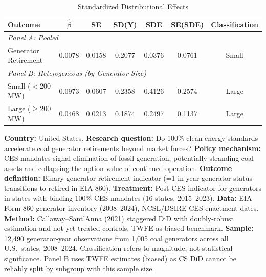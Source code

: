 \begin{table}[t]
\centering
\caption{Standardized Distributional Effects}
\label{tab:sde}
\begin{tabular}{lcccccc}
\hline\hline
Outcome & $\hat{\beta}$ & SE & SD(Y) & SDE & SE(SDE) & Classification \\
\hline
\multicolumn{7}{l}{\textit{Panel A: Pooled}} \\[3pt]
Generator Retirement & 0.0078 & 0.0158 & 0.2077 & 0.0376 & 0.0761 & Small \\
[6pt]
\multicolumn{7}{l}{\textit{Panel B: Heterogeneous (by Generator Size)}} \\[3pt]
Small ($<$200 MW) & 0.0973 & 0.0607 & 0.2358 & 0.4126 & 0.2574 & Large \\
Large ($\geq$200 MW) & 0.0468 & 0.0213 & 0.1874 & 0.2497 & 0.1137 & Large \\
\hline\hline
\end{tabular}
\begin{flushleft}\small
\textbf{Country:} United States.
\textbf{Research question:} Do 100\% clean energy standards accelerate coal generator retirements beyond market forces?
\textbf{Policy mechanism:} CES mandates signal elimination of fossil generation, potentially stranding coal assets and collapsing the option value of continued operation.
\textbf{Outcome definition:} Binary generator retirement indicator (=1 in year generator status transitions to retired in EIA-860).
\textbf{Treatment:} Post-CES indicator for generators in states with binding 100\% CES mandates (16 states, 2015--2023).
\textbf{Data:} EIA Form 860 generator inventory (2008--2024), NCSL/DSIRE CES enactment dates.
\textbf{Method:} Callaway--Sant'Anna (2021) staggered DiD with doubly-robust estimation and not-yet-treated controls. TWFE as biased benchmark.
\textbf{Sample:} 12,490 generator-year observations from 1,005 coal generators across all U.S.\ states, 2008--2024.
Classification refers to magnitude, not statistical significance. Panel B uses TWFE estimates (biased) as CS DiD cannot be reliably split by subgroup with this sample size.
\end{flushleft}
\end{table}
